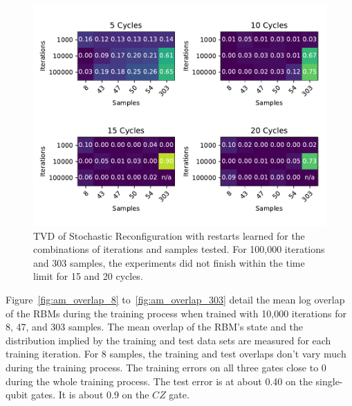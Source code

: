 \begin{figure}[H]
  \centering
  \includegraphics[width=\textwidth]{figures/results/AM-restarts-learned/fxeb_heatmap.pdf}
  \caption[Cross Entropy Difference of RBMs Trained with AdaMax with Random Restarts and $CZ$ Gates Learned]{TVD of Stochastic 
  Reconfiguration with restarts learned for the combinations of iterations and samples tested.
  For 100,000 iterations and 303 samples, the experiments did not finish within the time limit for 15 and 20 cycles.}
  \label{fig:am_fxeb}
\end{figure}

Figure~\ref{fig:am_overlap_8} to~\ref{fig:am_overlap_303} detail the mean log overlap of the RBMs during the 
training process when trained with 10,000 iterations for 8, 47, and 303 samples. The 
mean overlap of the RBM's state and the distribution implied by the training and test data sets are measured 
for each training iteration.
For 8 samples, the training and test overlaps don't vary much during the training process. The training errors on all three gates
close to 0 during the whole training process. The test error is at about 0.40 on the single-qubit gates. It is about 
0.9 on the $CZ$ gate.

